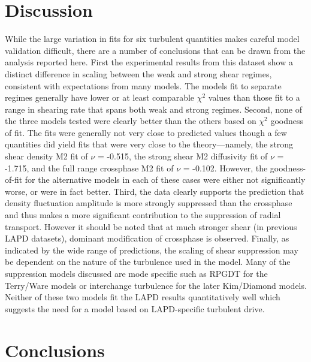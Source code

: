 \documentclass[aip,pop,amsmath,amssymb,preprint,superscriptaddress]{revtex4-1} %
\begin{document}
\section{Discussion}

While the large variation in fits for six turbulent quantities makes
careful model validation difficult, there are a number of conclusions
that can be drawn from the analysis reported here. First the
experimental results from this dataset show a distinct difference in
scaling between the weak and strong shear regimes, consistent with
expectations from many models. The models fit to separate regimes generally have lower or at least comparable $\chi^{2}$ values than those fit to a range in shearing rate that spans both weak and strong regimes. Second, none of the three models tested were clearly better than the others based on $\chi^{2}$ goodness of fit. The fits were generally not very close to predicted values though a few quantities did yield fits that were very close to the theory---namely, the strong shear density M2 fit of $\nu$ = -0.515, the strong shear M2 diffusivity fit of $\nu$ = -1.715, and the full range crossphase M2 fit of $\nu$ = -0.102. However, the goodness-of-fit for the alternative models in each of these cases were either not significantly worse, or were in fact better. Third, the data clearly supports the prediction that
density fluctuation amplitude is more strongly suppressed than the
crossphase and thus makes a more significant contribution to the
suppression of radial transport.  However it should be noted that at
much stronger shear (in previous LAPD datasets), dominant
modification of crossphase is observed.  Finally, as indicated by the
wide range of predictions, the scaling of shear suppression may be
dependent on the nature of the turbulence used in the model. Many of
the suppression models discussed are mode specific such as
RPGDT for the Terry/Ware models or interchange turbulence
for the later Kim/Diamond models. Neither of these two models fit the
LAPD results quantitatively well which suggests the need for a
model based on LAPD-specific turbulent drive.  

\section{Conclusions}
\end{document}

